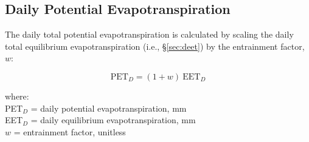 \subsection{Daily Potential Evapotranspiration}
\label{sec:dpet}
The daily total potential evapotranspiration is calculated by scaling the daily total equilibrium evapotranspiration (i.e., \S \ref{sec:deet}) by the entrainment factor, $w$:

\begin{equation}
\label{eq:daypet}
	\text{PET}_D = \left(1+w \right) \: \text{EET}_D
\end{equation}

\noindent where:\\
\indent PET$_D$ = daily potential evapotranspiration, mm\\
\indent EET$_D$ = daily equilibrium evapotranspiration, mm\\
\indent $w$ = entrainment factor, unitless \\

